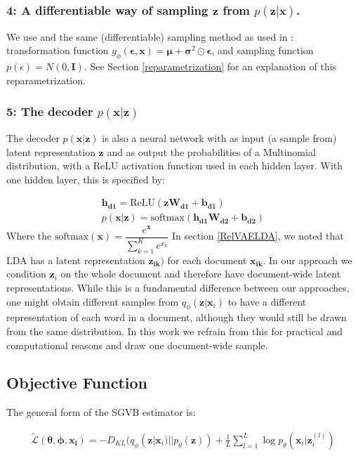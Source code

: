 \documentclass{report}
\begin{document}
\subsubsection{4: A differentiable way of sampling $\mathbf{z}$ from $p(\mathbf{z}|\mathbf{x})$.}
We use and the same (differentiable) sampling method as used in \cite{kingma2013auto}: transformation function $g_\phi(\boldsymbol{\epsilon},\mathbf{x}) = \boldsymbol{\mu} + \boldsymbol{\sigma}^2\odot \boldsymbol{\epsilon}$, and sampling function $p(\epsilon) = N(0,\textbf{I})$. See Section \ref{reparametrization} for an explanation of this reparametrization. \\

\subsubsection{5: The decoder $p(\mathbf{x}|\mathbf{z})$}
The decoder $p(\mathbf{x}|\mathbf{z})$ is also a neural network with as input (a sample from) latent representation $\mathbf{z}$ and as output the probabilities of a Multinomial distribution, with a ReLU activation function used in each hidden layer. With one hidden layer, this is specified by:

\begin{align}
\mathbf{h_{d1}} = \text{ReLU}(\mathbf{zW_{d1}+b_{d1}})
\\
p(\mathbf{x}|\mathbf{z}) = \text{softmax} (\mathbf{h_{d1}W_{d2}}+\mathbf{b_{d2}})
\end{align}
Where the $\text{softmax}(\mathbf{x}) = \dfrac{e^{\mathbf{x}}}{\sum_{k=1}^{K}e^{x_k}}$
In section \ref{RelVAELDA}, we noted that LDA has a latent representation $\mathbf{z_{ik})}$ for each document $\mathbf{x_{ik}}$. In our approach we condition $\mathbf{z}_i$ on the whole document and therefore have document-wide latent representations. While this is a fundamental difference between our approaches, one might obtain different samples from $q_\phi(\mathbf{z}|\mathbf{x}_i)$ to have a different representation of each word in a document, although they would still be drawn from the same distribution. In this work we refrain from this for practical and computational reasons and draw one document-wide sample.

\subsection{Objective Function}
The general form of the SGVB estimator is:

\begin{align}
\tilde{\mathcal{L}}(\boldsymbol{\theta}, \boldsymbol{\phi}, \mathbf{x_i}) = -D_{KL}(q_\phi (\mathbf{z}|\mathbf{x}_i)||p_\theta(\mathbf{z}))  + \frac{1}{L}\sum_{l=1}^{L}\log p_\theta(\mathbf{x}_i|\mathbf{z}_i^{(l)})
\end{align}
\end{document}
